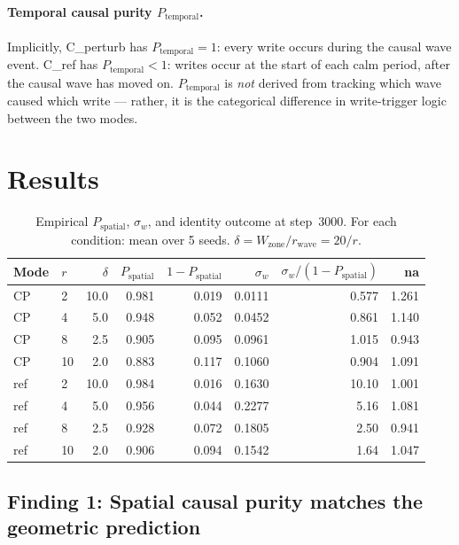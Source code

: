 \documentclass[11pt,a4paper]{article}
\newcommand{\Psp}{P_{\mathrm{spatial}}}
\newcommand{\Ptemp}{P_{\mathrm{temporal}}}
\begin{document}
\paragraph{Temporal causal purity $\Ptemp$.}
Implicitly, C\_perturb has $\Ptemp = 1$: every write occurs during the causal
wave event.
C\_ref has $\Ptemp < 1$: writes occur at the start of each calm period, after
the causal wave has moved on.
$\Ptemp$ is \emph{not} derived from tracking which wave caused which write ---
rather, it is the categorical difference in write-trigger logic between the two modes.

\section{Results}

\begin{table}[h]
\centering
\caption{Empirical $\Psp$, $\sigma_w$, and identity outcome at step~3000.
For each condition: mean over 5 seeds. $\delta = W_\mathrm{zone}/r_\mathrm{wave} = 20/r$.}
\label{tab:main}
\begin{tabular}{llrrrrrr}
\toprule
Mode & $r$ & $\delta$ & $\Psp$ & $1-\Psp$ & $\sigma_w$ & $\sigma_w/(1-\Psp)$ & na \\
\midrule
CP  & 2  & 10.0 & 0.981 & 0.019 & 0.0111 & 0.577 & 1.261 \\
CP  & 4  &  5.0 & 0.948 & 0.052 & 0.0452 & 0.861 & 1.140 \\
CP  & 8  &  2.5 & 0.905 & 0.095 & 0.0961 & 1.015 & 0.943 \\
CP  & 10 &  2.0 & 0.883 & 0.117 & 0.1060 & 0.904 & 1.091 \\
\midrule
ref & 2  & 10.0 & 0.984 & 0.016 & 0.1630 & 10.10 & 1.001 \\
ref & 4  &  5.0 & 0.956 & 0.044 & 0.2277 &  5.16 & 1.081 \\
ref & 8  &  2.5 & 0.928 & 0.072 & 0.1805 &  2.50 & 0.941 \\
ref & 10 &  2.0 & 0.906 & 0.094 & 0.1542 &  1.64 & 1.047 \\
\bottomrule
\end{tabular}
\end{table}

\subsection{Finding 1: Spatial causal purity matches the geometric prediction}
\end{document}

